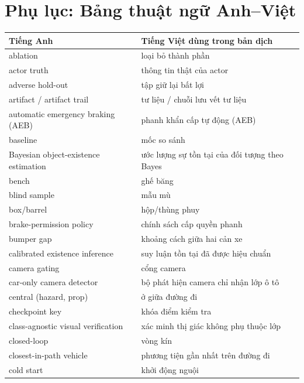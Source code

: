 \documentclass[11pt,a4paper]{article}
\begin{document}



\clearpage
\section*{Phụ lục: Bảng thuật ngữ Anh–Việt}
\begingroup\small
\setlength{\LTpre}{0.5em}
\begin{longtable}{@{}p{}p{}@{}}
\toprule
\textbf{Tiếng Anh} & \textbf{Tiếng Việt dùng trong bản dịch}\\
\midrule\endhead
\bottomrule\endfoot
ablation & loại bỏ thành phần\\
actor truth & thông tin thật của actor\\
adverse hold-out & tập giữ lại bất lợi\\
artifact / artifact trail & tư liệu / chuỗi lưu vết tư liệu\\
automatic emergency braking (AEB) & phanh khẩn cấp tự động (AEB)\\
baseline & mốc so sánh\\
Bayesian object-existence estimation & ước lượng sự tồn tại của đối tượng theo Bayes\\
bench & ghế băng\\
blind sample & mẫu mù\\
box/barrel & hộp/thùng phuy\\
brake-permission policy & chính sách cấp quyền phanh\\
bumper gap & khoảng cách giữa hai cản xe\\
calibrated existence inference & suy luận tồn tại đã được hiệu chuẩn\\
camera gating & cổng camera\\
car-only camera detector & bộ phát hiện camera chỉ nhận lớp ô tô\\
central (hazard, prop) & ở giữa đường đi\\
checkpoint key & khóa điểm kiểm tra\\
class-agnostic visual verification & xác minh thị giác không phụ thuộc lớp\\
closed-loop & vòng kín\\
closest-in-path vehicle & phương tiện gần nhất trên đường đi\\
cold start & khởi động nguội\\

\end{longtable}
\end{document}
